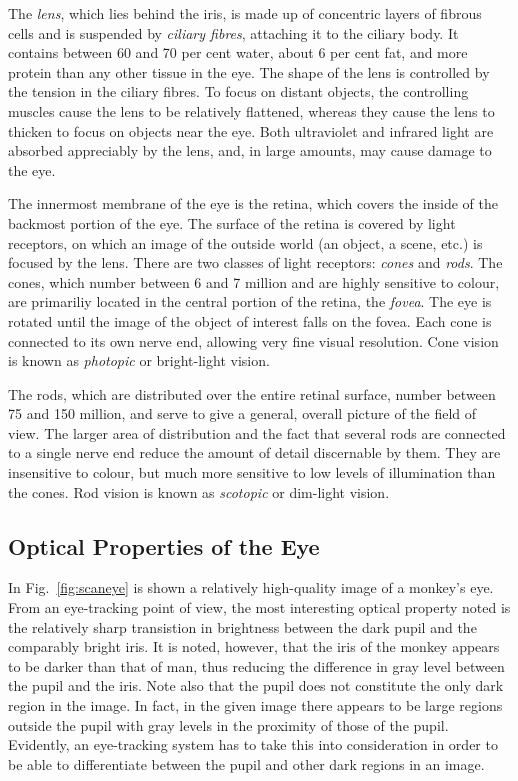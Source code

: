 
The {\em lens\/}, which lies behind the iris, is made up of concentric
layers of fibrous cells and is suspended by {\em ciliary fibres\/},
attaching it to the ciliary body.  It contains between 60 and 70 per
cent water, about 6 per cent fat, and more protein than any other
tissue in the eye.  The shape of the lens is controlled by the tension
in the ciliary fibres.  To focus on distant objects, the controlling
muscles cause the lens to be relatively flattened, whereas they cause
the lens to thicken to focus on objects near the eye.  Both
ultraviolet and infrared light are absorbed appreciably by the lens,
and, in large amounts, may cause damage to the eye.

The innermost membrane of the eye is the retina, which covers the
inside of the backmost portion of the eye.  The surface of the retina
is covered by light receptors, on which an image of the outside world
(an object, a scene, etc.) is focused by the lens.  There are two
classes of light receptors: {\em cones\/} and {\em rods\/}.  The
cones, which number between 6 and 7 million and are highly sensitive
to colour, are primariliy located in the central portion of the
retina, the {\em fovea\/}.  The eye is rotated until the image of the
object of interest falls on the fovea.  Each cone is connected to its
own nerve end, allowing very fine visual resolution.  Cone vision is
known as {\em photopic\/} or bright-light vision.

The rods, which are distributed over the entire retinal surface,
number between 75 and 150 million, and serve to give a general,
overall picture of the field of view.  The larger area of distribution
and the fact that several rods are connected to a single nerve end
reduce the amount of detail discernable by them.  They are insensitive
to colour, but much more sensitive to low levels of illumination than
the cones.  Rod vision is known as {\em scotopic\/} or dim-light
vision.

\subsection{Optical Properties of the Eye}
\label{back:eye:visual}

In Fig.~\ref{fig:scaneye} is shown a relatively high-quality image of
a monkey's eye.  From an eye-tracking point of view, the most
interesting optical property noted is the relatively sharp transistion
in brightness between the dark pupil and the comparably bright iris.
It is noted, however, that the iris of the monkey appears to be darker
than that of man, thus reducing the difference in gray level between
the pupil and the iris.  Note also that the pupil does not constitute
the only dark region in the image.  In fact, in the given image there
appears to be large regions outside the pupil with gray levels in the
proximity of those of the pupil.  Evidently, an eye-tracking system
has to take this into consideration in order to be able to
differentiate between the pupil and other dark regions in an image.

